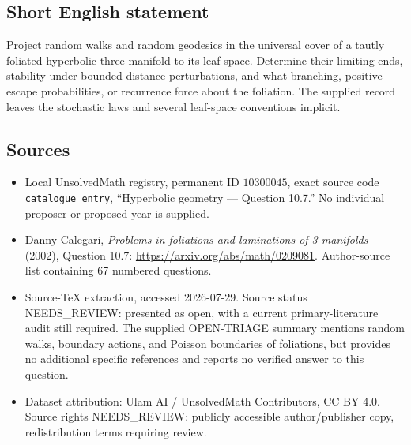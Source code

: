 \documentclass[11pt]{article}
\begin{document}
\subsection{Short English statement}
Project random walks and random geodesics in the universal cover of a tautly foliated hyperbolic three-manifold to its leaf space. Determine their limiting ends, stability under bounded-distance perturbations, and what branching, positive escape probabilities, or recurrence force about the foliation. The supplied record leaves the stochastic laws and several leaf-space conventions implicit.
\subsection{Sources}
\begin{itemize}
\item Local UnsolvedMath registry, permanent ID \(10300045\), exact source code \texttt{catalogue entry}, ``Hyperbolic geometry --- Question 10.7.'' No individual proposer or proposed year is supplied.
\item Danny Calegari, \emph{Problems in foliations and laminations of 3-manifolds} (2002), Question 10.7: \url{https://arxiv.org/abs/math/0209081}. Author-source list containing 67 numbered questions.
\item Source-TeX extraction, accessed 2026-07-29. Source status NEEDS\_REVIEW: presented as open, with a current primary-literature audit still required. The supplied OPEN-TRIAGE summary mentions random walks, boundary actions, and Poisson boundaries of foliations, but provides no additional specific references and reports no verified answer to this question.
\item Dataset attribution: Ulam AI / UnsolvedMath Contributors, CC BY 4.0. Source rights NEEDS\_REVIEW: publicly accessible author/publisher copy, redistribution terms requiring review.
\end{itemize}
\end{document}
